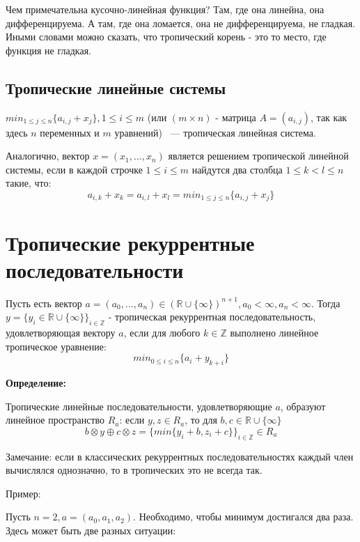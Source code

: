 \documentclass[russian]{lecture-notes}
\begin{document}
Чем примечательна кусочно-линейная функция? Там, где она линейна, она дифференцируема. А там, где она ломается, она не дифференцируема, не гладкая. Иными словами можно сказать, что тропический корень - это то место, где функция не гладкая.
\subsection{ Тропические линейные системы}

\begin{Definition}
	$min_{1\le j\le n}\{a_{i,j}+x_j\}, 1\le i\le m$ (или $(m\times n)$ - матрица $A=(a_{i,j})$, так как здесь $n$ переменных и $m$ уравнений) ~--- тропическая линейная система.
	\end{Definition}
\begin{Definition}
	Аналогично, вектор $x=(x_1,\ldots, x_n)$ является решением тропической линейной системы, если в каждой строчке $1\le i\le m$ найдутся два столбца $1\le k<l\le n$ такие, что:
	\[
	a_{i,k}+x_k=a_{i,l}+x_l=min_{1\le j\le n}\{a_{i,j}+x_j\}
	\]
	\end{Definition}


\section{Тропические рекуррентные последовательности}
\begin{Definition}
	Пусть есть вектор $a=(a_0,\ldots ,a_n)\in (\mathbb{R} \cup \{\infty\})^{n+1}, a_0<\infty , a_n<\infty$. Тогда $y=\{y_i\in \mathbb{R}\cup \{\infty\}\}_{i\in\mathbb{Z}}$ - тропическая рекуррентная последовательность, удовлетворяющая вектору $a$, если для любого $k\in\mathbb{Z}$ выполнено линейное тропическое уравнение:
	\[
	min_{0\le i\le n}\{a_i+y_{k+i}\}
	\]
\end{Definition}
\bfseries Определение: \mdseries


Тропические линейные последовательности, удовлетворяющие $a$, образуют линейное пространство $R_a$: если $y, z \in R_a $, то для $b, c\in \mathbb{R}\cup\{\infty\}$
\[
b\otimes y\oplus c\otimes z=\{min\{y_i+b, z_i+c\}\}_{i\in\mathbb{Z}}\in R_a
\]

Замечание: если в классических рекуррентных последовательностях каждый член вычислялся однозначно, то в тропических это не всегда так.


Пример:

Пусть $n=2, a=(a_0, a_1, a_2).$
Необходимо, чтобы минимум достигался два раза. Здесь может быть две разных ситуации:
\end{document}
